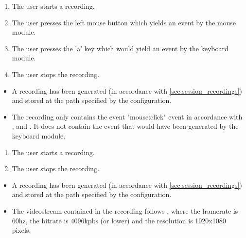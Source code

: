 \begin{tests}
    {\begin{enumerate}
        \item The \gls{user} starts a recording.
        \item The \gls{user} presses the left mouse button which yields an \gls{event} by the mouse module.
        \item The \gls{user} presses the 'a' key which would yield an \gls{event} by the keyboard module.
        \item The \gls{user} stops the recording.
    \end{enumerate}}
    {\begin{itemize}
        \item A recording has been generated (in accordance with \ref{sec:session_recordings}) and stored at the path specified by the configuration.
        \item The recording only contains the \gls{event} "mouse:click" event in accordance with ,  and . It does not contain the \gls{event} that would have been generated by the keyboard module.
    \end{itemize}}

    {\begin{enumerate}
        \item The \gls{user} starts a recording.
        \item The \gls{user} stops the recording.
    \end{enumerate}}
    {\begin{itemize}
        \item A recording has been generated (in accordance with \ref{sec:session_recordings}) and stored at the path specified by the configuration.
        \item The videostream contained in the recording follows , where the framerate is 60hz, the bitrate is 4096kpbs (or lower) and the resolution is 1920x1080 pixels.
    \end{itemize}}


\end{tests}
